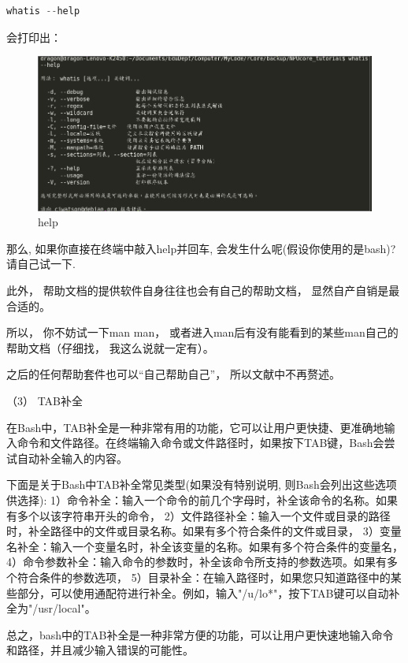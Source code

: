 \begin{lstlisting}[language={Rust}, label={code:forktest},
	caption={forktest.rs}]
	whatis --help
\end{lstlisting}

会打印出：
\begin{figure}[htb]
	\centering
	\includegraphics[width=\textwidth]{figures/02-01-help.png}
	\caption{
		help
	}
	\label{fig:help}
\end{figure}
那么, 如果你直接在终端中敲入help并回车, 会发生什么呢(假设你使用的是bash)?请自己试一下.

此外， 帮助文档的提供软件自身往往也会有自己的帮助文档， 显然自产自销是最合适的。

所以， 你不妨试一下man man， 或者进入man后有没有能看到的某些man自己的帮助文档（仔细找， 我这么说就一定有）。

之后的任何帮助套件也可以“自己帮助自己”， 所以文献中不再赘述。

（3） TAB补全

在Bash中，TAB补全是一种非常有用的功能，它可以让用户更快捷、更准确地输入命令和文件路径。在终端输入命令或文件路径时，如果按下TAB键，Bash会尝试自动补全输入的内容。

下面是关于Bash中TAB补全常见类型(如果没有特别说明, 则Bash会列出这些选项供选择):
1）命令补全：输入一个命令的前几个字母时，补全该命令的名称。如果有多个以该字符串开头的命令，
2）文件路径补全：输入一个文件或目录的路径时，补全路径中的文件或目录名称。如果有多个符合条件的文件或目录，
3）变量名补全：输入一个变量名时，补全该变量的名称。如果有多个符合条件的变量名，
4）命令参数补全：输入命令的参数时，补全该命令所支持的参数选项。如果有多个符合条件的参数选项，
5）目录补全：在输入路径时，如果您只知道路径中的某些部分，可以使用通配符进行补全。例如，输入"/u/lo*"，按下TAB键可以自动补全为"/usr/local"。

总之，bash中的TAB补全是一种非常方便的功能，可以让用户更快速地输入命令和路径，并且减少输入错误的可能性。

